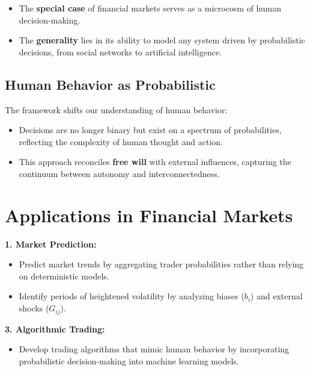 \documentclass[a4]{article}
\newcommand{\bn}{\bigskip\noindent}
\begin{document}
\begin{itemize}
\item  The {\bf special case}  of financial markets serves as a microcosm of human decision-making.
\item The {\bf generality}  lies in its ability to model any system driven by probabilistic decisions, from social networks to artificial intelligence.
\end{itemize}

\subsection{Human Behavior as Probabilistic} 
The framework shifts our understanding of human behavior:

\begin{itemize}
\item  Decisions are no longer binary but exist on a spectrum of probabilities, reflecting the complexity of human thought and action.
\item This approach reconciles {\bf free will}  with external influences, capturing the continuum between autonomy and interconnectedness.
\end{itemize}


\section{Applications in Financial Markets}

 {\bf 1. Market Prediction:} 

\begin{itemize}
\item  Predict market trends by aggregating trader probabilities rather than relying on deterministic models.
\end{itemize}
 
\bn{\bf 2. Risk Management:} 

\begin{itemize}
\item  Identify periods of heightened volatility by analyzing biases ($b_i$) and external shocks ($G_{ij}$).
\end{itemize}

\bn
 {\bf 3. Algorithmic Trading:} 

\begin{itemize}
\item  Develop trading algorithms that mimic human behavior by incorporating probabilistic decision-making into machine learning models.
\end{itemize}
\end{document}
